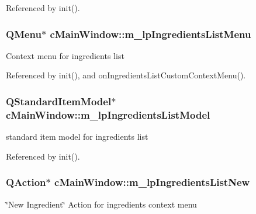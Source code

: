 Referenced by init().

\subsubsection[{\texorpdfstring{m\+\_\+lp\+Ingredients\+List\+Menu}{m_lpIngredientsListMenu}}]{\setlength{\rightskip}{0pt plus 5cm}Q\+Menu$\ast$ c\+Main\+Window\+::m\+\_\+lp\+Ingredients\+List\+Menu\hspace{0.3cm}{\ttfamily [private]}}\hypertarget{classc_main_window_a67c09407f3fc781eb743a395f86dc44c}{}\label{classc_main_window_a67c09407f3fc781eb743a395f86dc44c}
Context menu for ingredients list 

Referenced by init(), and on\+Ingredients\+List\+Custom\+Context\+Menu().

\subsubsection[{\texorpdfstring{m\+\_\+lp\+Ingredients\+List\+Model}{m_lpIngredientsListModel}}]{\setlength{\rightskip}{0pt plus 5cm}Q\+Standard\+Item\+Model$\ast$ c\+Main\+Window\+::m\+\_\+lp\+Ingredients\+List\+Model\hspace{0.3cm}{\ttfamily [private]}}\hypertarget{classc_main_window_a839ead885151027601d9be7d87aade26}{}\label{classc_main_window_a839ead885151027601d9be7d87aade26}
standard item model for ingredients list 

Referenced by init().

\subsubsection[{\texorpdfstring{m\+\_\+lp\+Ingredients\+List\+New}{m_lpIngredientsListNew}}]{\setlength{\rightskip}{0pt plus 5cm}Q\+Action$\ast$ c\+Main\+Window\+::m\+\_\+lp\+Ingredients\+List\+New\hspace{0.3cm}{\ttfamily [private]}}\hypertarget{classc_main_window_aff7c0651707a2c73cfdc49d709419f1e}{}\label{classc_main_window_aff7c0651707a2c73cfdc49d709419f1e}
\char`\"{}\+New Ingredient\char`\"{} Action for ingredients context menu 

